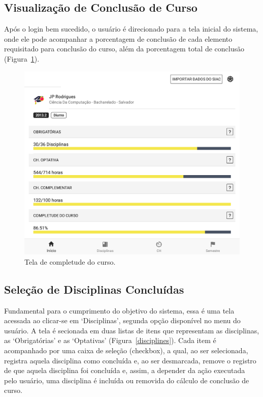 \subsection{Visualização de Conclusão de Curso}
Após o login bem sucedido, o usuário é direcionado para a tela inicial do sistema, onde ele pode acompanhar a porcentagem de conclusão de cada elemento requisitado para conclusão do curso, além da porcentagem total de conclusão (Figura~\ref{completude}).
\begin{figure}[H]
	   \centering
	   		\includegraphics[scale=0.25]{pics/c3/3-completude.png}
	   \caption{Tela de completude do curso.}
	   \label{completude}
\end{figure}

\subsection{Seleção de Disciplinas Concluídas}
\label{disciplinas_tela}
Fundamental para o cumprimento do objetivo do sistema, essa é uma tela acessada ao clicar-se em ‘Disciplinas’, segunda opção disponível no menu do usuário.  A tela é secionada em duas listas de itens que representam as disciplinas, as ‘Obrigatórias’ e as ‘Optativas’ (Figura~\ref{disciplines}). Cada item é acompanhado por uma caixa de seleção (checkbox), a qual, ao ser selecionada, registra aquela disciplina como concluída e, ao ser desmarcada, remove o registro de que aquela disciplina foi concluída e, assim, a depender da ação executada pelo usuário, uma disciplina é incluída ou removida do cálculo de conclusão de curso.


